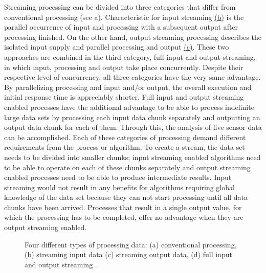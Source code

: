 	Streaming processing can be divided into three categories that differ from conventional processing (see a). Characteristic for input streaming \hyperref[fig:streaming]{(b)} is the parallel occurrence of input and processing with a subsequent output after processing finished. On the other hand, output streaming processing describes the isolated input supply and parallel processing and output \hyperref[fig:streaming]{(c)}. These two approaches are combined in the third category, full input and output streaming, in which input, processing and output take place concurrently. Despite their respective level of concurrency, all three categories have the very same advantage. By parallelizing processing and input and/or output, the overall execution and initial response time is appreciably shorter. Full input and output streaming enabled processes have the additional advantage to be able to process indefinite large data sets by processing each input data chunk separately and outputting an output data chunk for each of them. Through this, the analysis of live sensor data can be accomplished. Each of these categories of processing demand different requirements from the process or algorithm. To create a stream, the data set needs to be divided into smaller chunks; input streaming enabled algorithms need to be able to operate on each of these chunks separately and output streaming enabled processes need to be able to produce intermediate results. Input streaming would not result in any benefits for algorithms requiring global knowledge of the data set because they can not start processing until all data chunks have been arrived. Processes that result in a single output value, for which the processing has to be completed, offer no advantage when they are output streaming enabled.

	\begin{figure}[!htb]
		\centering
		
		\caption{\label{fig:streaming}Four different types of processing data: (a) conventional processing, (b) streaming input data (c) streaming output data, (d) full input and output streaming \citep[based on][]{foerster2012live}.}
	\end{figure}

